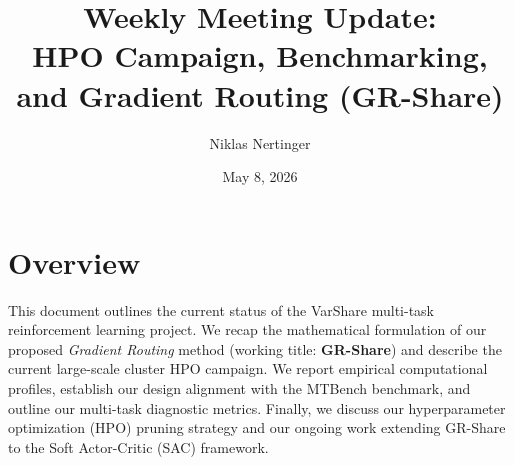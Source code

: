 \documentclass[11pt,a4paper]{article}
\title{Weekly Meeting Update:\\ HPO Campaign, Benchmarking, and Gradient Routing (GR-Share)}
\author{Niklas Nertinger}
\date{May 8, 2026}
\begin{document}
\maketitle
\section*{Overview}
This document outlines the current status of the VarShare multi-task reinforcement learning project. We recap the mathematical formulation of our proposed \textit{Gradient Routing} method (working title: \textbf{GR-Share}) and describe the current large-scale cluster HPO campaign. We report empirical computational profiles, establish our design alignment with the MTBench benchmark, and outline our multi-task diagnostic metrics. Finally, we discuss our hyperparameter optimization (HPO) pruning strategy and our ongoing work extending GR-Share to the Soft Actor-Critic (SAC) framework.
\end{document}
